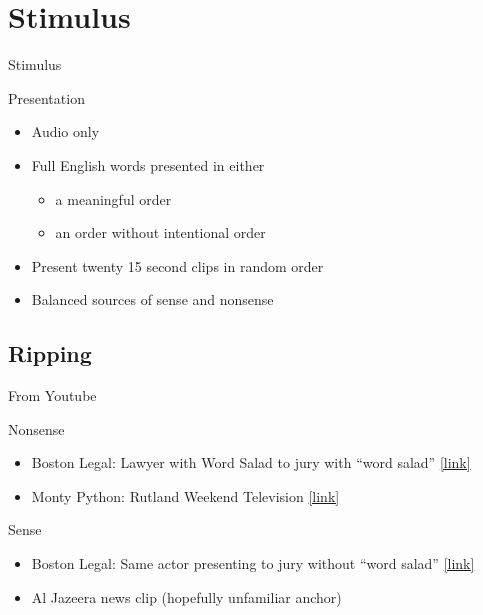 \section{Stimulus}
\begin{frame}{Stimulus}
    \begin{block}{Presentation} \begin{itemize}
	\item Audio only
	\item Full English words presented in either 
		\begin{itemize} 
			\item a meaningful order 
			\item an order without intentional order 
		\end{itemize}
	\item Present twenty 15 second clips in random order
	\item Balanced sources of sense and nonsense
    \end{itemize} \end{block}
\end{frame}

\subsection{Ripping}
\begin{frame}{From Youtube}
    \begin{block}{Nonsense} \begin{itemize}
	\item Boston Legal: Lawyer with Word Salad to jury with ``word salad'' \href{http://www.youtube.com/watch?v=2wkZfq86kgY\#t=20s}{ [link]}
	\item Monty Python: Rutland Weekend Television \href{http://www.youtube.com/watch?v=hU0QZQRTNr0\#t=20s}{ [link]}
    \end{itemize} \end{block}
    \begin{block}{Sense} \begin{itemize}
	\item Boston Legal: Same actor presenting to jury without ``word salad'' \href{http://www.youtube.com/watch?v=7TegIxJUsE0&NR}{ [link]}  
	\item Al Jazeera news clip (hopefully unfamiliar anchor)
    \end{itemize} \end{block}
\end{frame}

